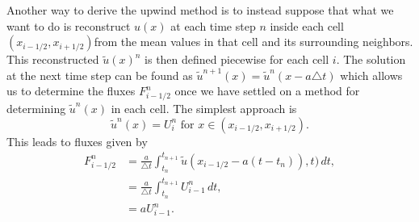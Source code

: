 Another way to derive the upwind method is to instead suppose that what we want to do is reconstruct $u(x)$ at each time step $n$ inside each cell $(x_{i-1/2},x_{i+1/2})$from the mean values in that cell and its surrounding neighbors. This reconstructed $\tilde{u}(x)^n$ is then defined piecewise for each cell $i$. The solution at the next time step can be found as $\tilde{u}^{n+1}(x) = \tilde{u}^n(x-a\triangle t)$ which allows us to determine the fluxes $F^n_{i-1/2}$ once we have settled on a method for determining $\tilde{u}^n(x)$ in each cell. The simplest approach is 
\[ \tilde{u}^n(x) = U_i^n \text{ for }x \in (x_{i-1/2},x_{i+1/2}). \]
This leads to fluxes given by 
\begin{align}
F_{i-1/2}^n &= \frac{a}{\triangle t}\int_{t_n}^{t_{n+1}} \tilde{u}(x_{i-1/2}- a (t-t_n)),t)\, dt , \\
&= \frac{a}{\triangle t}\int_{t_n}^{t_{n+1}} U_{i-1}^n\, dt ,\nonumber\\
&= aU_{i-1}^n.\nonumber
\end{align}


